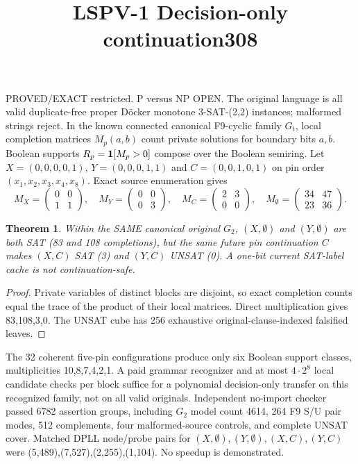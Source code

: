 \documentclass{article}
\newtheorem{theorem}{Theorem}
\begin{document}
\title{LSPV-1 Decision-only continuation308}\maketitle
\noindent PROVED/EXACT restricted. P versus NP OPEN.
The original language is all valid duplicate-free proper D\"ocker monotone 3-SAT-(2,2) instances; malformed strings reject. In the known connected canonical F9-cyclic family $G_t$, local completion matrices $M_p(a,b)$ count private solutions for boundary bits $a,b$. Boolean supports $R_p={\bf1}[M_p>0]$ compose over the Boolean semiring. Let $X=(0,0,0,0,1)$, $Y=(0,0,0,1,1)$ and $C=(0,0,1,0,1)$ on pin order $(x_1,x_2,x_3,x_4,x_8)$. Exact source enumeration gives
\[
M_X=\begin{pmatrix}0&0\\1&1\end{pmatrix},\quad
M_Y=\begin{pmatrix}0&0\\0&3\end{pmatrix},\quad
M_C=\begin{pmatrix}2&3\\0&0\end{pmatrix},\quad
M_{\emptyset}=\begin{pmatrix}34&47\\23&36\end{pmatrix}.
\]
\begin{theorem}
Within the SAME canonical original $G_2$, $(X,\emptyset)$ and $(Y,\emptyset)$ are both SAT (83 and 108 completions), but the same future pin continuation $C$ makes $(X,C)$ SAT (3) and $(Y,C)$ UNSAT (0). A one-bit current SAT-label cache is not continuation-safe.
\end{theorem}
\begin{proof}
Private variables of distinct blocks are disjoint, so exact completion counts equal the trace of the product of their local matrices. Direct multiplication gives 83,108,3,0. The UNSAT cube has 256 exhaustive original-clause-indexed falsified leaves.
\end{proof}
The 32 coherent five-pin configurations produce only six Boolean support classes, multiplicities 10,8,7,4,2,1. A paid grammar recognizer and at most $4\cdot2^8$ local candidate checks per block suffice for a polynomial decision-only transfer on this recognized family, not on all valid originals.
Independent no-import checker passed 6782 assertion groups, including $G_2$ model count 4614, 264 F9 S/U pair modes, 512 complements, four malformed-source controls, and complete UNSAT cover. Matched DPLL node/probe pairs for $(X,\emptyset),(Y,\emptyset),(X,C),(Y,C)$ were (5,489),(7,527),(2,255),(1,104). No speedup is demonstrated.
\end{document}
